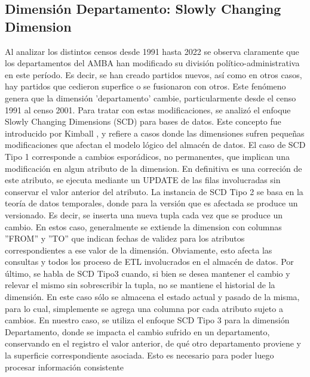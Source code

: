 \documentclass{article}
\theoremstyle{mytheoremstyle}
\theoremstyle{mytheoremstyle}
\theoremstyle{myproblemstyle}
\begin{document}
 \subsection{Dimensión Departamento: Slowly Changing Dimension }
 Al analizar los distintos censos desde 1991 hasta 2022 se observa claramente que los departamentos del 
 AMBA han modificado su división político-administrativa en este período.
  Es decir, se han creado partidos nuevos, así como en otros casos, hay partidos que cedieron superfice o se fusionaron con otros.
  Este fenómeno genera que la dimensión 'departamento' cambie, particularmente desde el censo 1991 al censo 2001.\newline\newline
  Para tratar con estas modificaciones, se analizó el enfoque Slowly Changing Dimensions (SCD) para bases de datos. 
Este concepto fue introducido por Kimball , y refiere a casos donde las dimensiones sufren pequeñas 
modificaciones que afectan el modelo lógico del almacén de datos.\newline\newline
  El caso de SCD Tipo 1 corresponde a cambios esporádicos, no permanentes, que implican una modificación en algun atributo de la dimension. 
En definitiva es una correción de este atributo, se ejecuta mediante un UPDATE de las filas involucradas sin conservar el valor anterior del atributo.
  La instancia de SCD Tipo 2 se basa en la teoría de datos temporales, donde para la versión que es afectada se produce un versionado.
  Es decir, se inserta una nueva tupla cada vez que se produce un cambio. En estos caso, generalmente se extiende la dimension con columnas
   ''FROM'' y ''TO'' que indican  fechas de validez para los atributos correspondientes a ese valor de la dimensión. Obviamente, esto afecta las consultas
 y todos los proceso  de ETL involucrados en el almacén de datos.  Por último, se habla de  SCD Tipo3 cuando, si bien se desea mantener el cambio y 
  relevar el mismo sin sobrescribir la tupla, no se mantiene el historial de la dimensión. En este caso sólo se almacena el estado actual y pasado de la misma,
para lo cual, simplemente se agrega una columna por cada atributo sujeto a cambios.\newline\newline
  En nuestro caso, se utiliza el enfoque SCD Tipo 3 para la dimensión Departamento, donde se impacta el cambio sufrido en un departamento, conservando 
en el registro el valor anterior, de qué otro departamento proviene y la superficie correspondiente asociada. Esto es necesario para poder luego procesar información consistente 
\end{document}
